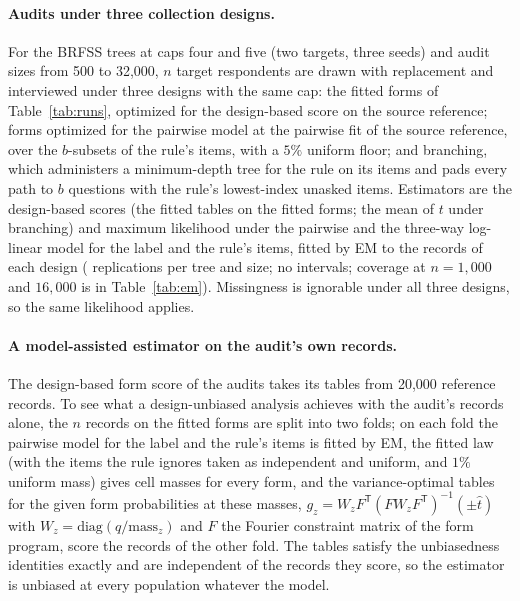 \paragraph{Audits under three collection designs.}
For the BRFSS trees at caps four and five (two targets, three seeds) and audit sizes from 500 to 32,000, $n$ target respondents are drawn with replacement and interviewed under three designs with the same cap: the fitted forms of Table~\ref{tab:runs}, optimized for the design-based score on the source reference; forms optimized for the pairwise model at the pairwise fit of the source reference, over the $b$-subsets of the rule's items, with a $5\%$ uniform floor; and branching, which administers a minimum-depth tree for the rule on its items and pads every path to $b$ questions with the rule's lowest-index unasked items. Estimators are the design-based scores (the fitted tables on the fitted forms; the mean of $t$ under branching) and maximum likelihood under the pairwise and the three-way log-linear model for the label and the rule's items, fitted by EM to the records of each design (\nCurveReps{} replications per tree and size; no intervals; coverage at $n=1{,}000$ and $16{,}000$ is in Table~\ref{tab:em}). Missingness is ignorable under all three designs, so the same likelihood applies.

\nAuditAppendixText

\paragraph{A model-assisted estimator on the audit's own records.}
The design-based form score of the audits takes its tables from 20,000 reference records. To see what a design-unbiased analysis achieves with the audit's records alone, the $n$ records on the fitted forms are split into two folds; on each fold the pairwise model for the label and the rule's items is fitted by EM, the fitted law (with the items the rule ignores taken as independent and uniform, and $1\%$ uniform mass) gives cell masses for every form, and the variance-optimal tables for the given form probabilities at these masses, $g_z=W_zF^{\mathsf T}(FW_zF^{\mathsf T})^{-1}(\pm\hat t)$ with $W_z=\mathrm{diag}(q/\text{mass}_z)$ and $F$ the Fourier constraint matrix of the form program, score the records of the other fold. The tables satisfy the unbiasedness identities exactly and are independent of the records they score, so the estimator is unbiased at every population whatever the model.

\nAipwAppendixText

